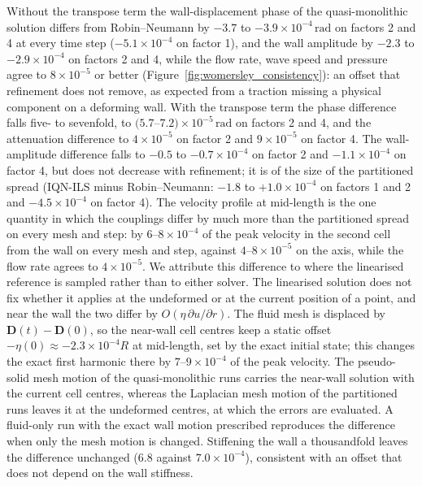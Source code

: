 Without the transpose term the wall-displacement phase of the quasi-monolithic solution differs from Robin--Neumann by $-3.7$ to $-3.9\times10^{-4}\,\mathrm{rad}$ on factors 2 and 4 at every time step ($-5.1\times10^{-4}$ on factor 1), and the wall amplitude by $-2.3$ to $-2.9\times10^{-4}$ on factors 2 and 4, while the flow rate, wave speed and pressure agree to $8\times10^{-5}$ or better (Figure~\ref{fig:womersley_consistency}): an offset that refinement does not remove, as expected from a traction missing a physical component on a deforming wall.
With the transpose term the phase difference falls five- to sevenfold, to $(5.7$--$7.2)\times10^{-5}\,\mathrm{rad}$ on factors 2 and 4, and the attenuation difference to $4\times10^{-5}$ on factor 2 and $9\times10^{-5}$ on factor 4.
The wall-amplitude difference falls to $-0.5$ to $-0.7\times10^{-4}$ on factor 2 and $-1.1\times10^{-4}$ on factor 4, but does not decrease with refinement; it is of the size of the partitioned spread (IQN-ILS minus Robin--Neumann: $-1.8$ to $+1.0\times10^{-4}$ on factors 1 and 2 and $-4.5\times10^{-4}$ on factor 4).
The velocity profile at mid-length is the one quantity in which the couplings differ by much more than the partitioned spread on every mesh and step: by $6$--$8\times10^{-4}$ of the peak velocity in the second cell from the wall on every mesh and step, against $4$--$8\times10^{-5}$ on the axis, while the flow rate agrees to $4\times10^{-5}$.
We attribute this difference to where the linearised reference is sampled rather than to either solver.
The linearised solution does not fix whether it applies at the undeformed or at the current position of a point, and near the wall the two differ by $O(\eta\,\partial u/\partial r)$. The fluid mesh is displaced by $\mathbf{D}(t)-\mathbf{D}(0)$, so the near-wall cell centres keep a static offset $-\eta(0)\approx-2.3\times10^{-4}R$ at mid-length, set by the exact initial state; this changes the exact first harmonic there by $7$--$9\times10^{-4}$ of the peak velocity.
The pseudo-solid mesh motion of the quasi-monolithic runs carries the near-wall solution with the current cell centres, whereas the Laplacian mesh motion of the partitioned runs leaves it at the undeformed centres, at which the errors are evaluated.
A fluid-only run with the exact wall motion prescribed reproduces the difference when only the mesh motion is changed. Stiffening the wall a thousandfold leaves the difference unchanged ($6.8$ against $7.0\times10^{-4}$), consistent with an offset that does not depend on the wall stiffness.
